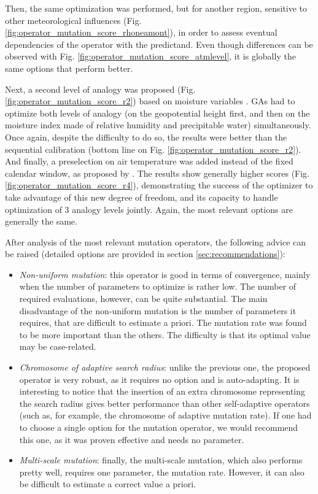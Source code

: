 \documentclass{ametsoc}
\begin{document}
Then, the same optimization was performed, but for another region, sensitive to other meteorological influences (Fig. \ref{fig:operator_mutation_score_rhoneamont}), in order to assess eventual dependencies of the operator with the predictand. Even though differences can be observed with Fig. \ref{fig:operator_mutation_score_atmlevel}, it is globally the same options that perform better.

Next, a second level of analogy was proposed (Fig. \ref{fig:operator_mutation_score_r2}) based on moisture variables \citep[see][]{Bontron2004}. GAs had to optimize both levels of analogy (on the geopotential height first, and then on the moisture index made of relative humidity and precipitable water) simultaneously. Once again, despite the difficulty to do so, the results were better than the sequential calibration (bottom line on Fig. \ref{fig:operator_mutation_score_r2}). And finally, a preselection on air temperature was added instead of the fixed calendar window, as proposed by \cite{BenDaoud2016}. The results show generally higher scores (Fig. \ref{fig:operator_mutation_score_r4}), demonstrating the success of the optimizer to take advantage of this new degree of freedom, and its capacity to handle optimization of 3 analogy levels jointly. Again, the most relevant options are generally the same.

After analysis of the most relevant mutation operators, the following advice can be raised (detailed options are provided in section \ref{sec:recommendations}):

\begin{itemize}
	
	\item \textit{Non-uniform mutation}: this operator is good in terms of convergence, mainly when the number of parameters to optimize is rather low. The number of required evaluations, however, can be quite substantial. The main disadvantage of the non-uniform mutation is the number of parameters it requires, that are difficult to estimate a priori. The mutation rate was found to be more important than the others. The difficulty is that its optimal value may be case-related.
	
	\item \textit{Chromosome of adaptive search radius}: unlike the previous one, the proposed operator is very robust, as it requires no option and is auto-adapting. It is interesting to notice that the insertion of an extra chromosome representing the search radius gives better performance than other self-adaptive operators (such as, for example, the chromosome of adaptive mutation rate). If one had to choose a single option for the mutation operator, we would recommend this one, as it was proven effective and needs no parameter.
	
	\item \textit{Multi-scale mutation}: finally, the multi-scale mutation, which also performs pretty well, requires one parameter, the mutation rate. However, it can also be difficult to estimate a correct value a priori.
	
\end{itemize}
\end{document}
